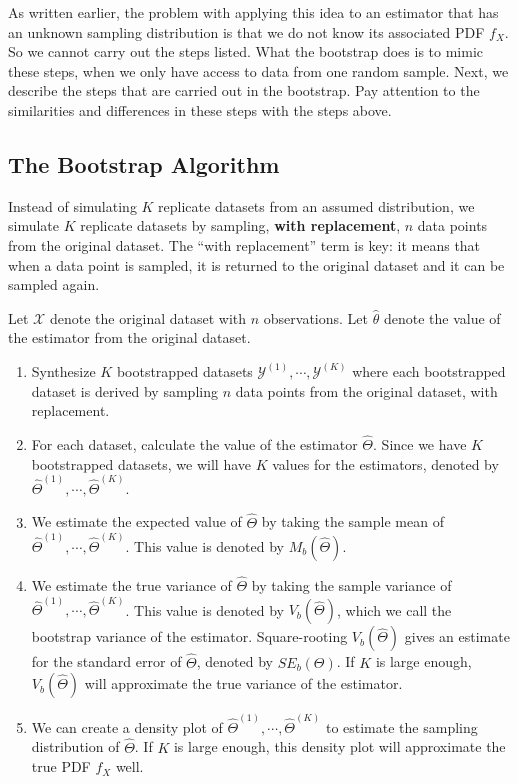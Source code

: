 \documentclass[
]{book}
\theoremstyle{definition}
\theoremstyle{definition}
\theoremstyle{definition}
\theoremstyle{definition}
\theoremstyle{remark}
\begin{document}
As written earlier, the problem with applying this idea to an estimator that has an unknown sampling distribution is that we do not know its associated PDF \(f_X\). So we cannot carry out the steps listed. What the bootstrap does is to mimic these steps, when we only have access to data from one random sample. Next, we describe the steps that are carried out in the bootstrap. Pay attention to the similarities and differences in these steps with the steps above.

\hypertarget{the-bootstrap-algorithm}{%
\subsection{The Bootstrap Algorithm}\label{the-bootstrap-algorithm}}

Instead of simulating \(K\) replicate datasets from an assumed distribution, we simulate \(K\) replicate datasets by sampling, \textbf{with replacement}, \(n\) data points from the original dataset. The ``with replacement'' term is key: it means that when a data point is sampled, it is returned to the original dataset and it can be sampled again.

Let \(\mathcal{X}\) denote the original dataset with \(n\) observations. Let \(\hat{\theta}\) denote the value of the estimator from the original dataset.

\begin{enumerate}
\def\labelenumi{\arabic{enumi}.}
\item
  Synthesize \(K\) bootstrapped datasets \(\mathcal{Y}^{(1)}, \cdots, \mathcal{Y}^{(K)}\) where each bootstrapped dataset is derived by sampling \(n\) data points from the original dataset, with replacement.
\item
  For each dataset, calculate the value of the estimator \(\hat{\Theta}\). Since we have \(K\) bootstrapped datasets, we will have \(K\) values for the estimators, denoted by \(\hat{\Theta}^{(1)}, \cdots, \hat{\Theta}^{(K)}\).
\item
  We estimate the expected value of \(\hat{\Theta}\) by taking the sample mean of \(\hat{\Theta}^{(1)}, \cdots, \hat{\Theta}^{(K)}\). This value is denoted by \(M_b(\hat{\Theta})\).
\item
  We estimate the true variance of \(\hat{\Theta}\) by taking the sample variance of \(\hat{\Theta}^{(1)}, \cdots, \hat{\Theta}^{(K)}\). This value is denoted by \(V_b(\hat{\Theta})\), which we call the bootstrap variance of the estimator. Square-rooting \(V_b(\hat{\Theta})\) gives an estimate for the standard error of \(\hat{\Theta}\), denoted by \(SE_b(\Theta)\). If \(K\) is large enough, \(V_b(\hat{\Theta})\) will approximate the true variance of the estimator.
\item
  We can create a density plot of \(\hat{\Theta}^{(1)}, \cdots, \hat{\Theta}^{(K)}\) to estimate the sampling distribution of \(\hat{\Theta}\). If \(K\) is large enough, this density plot will approximate the true PDF \(f_X\) well.
\end{enumerate}
\end{document}
